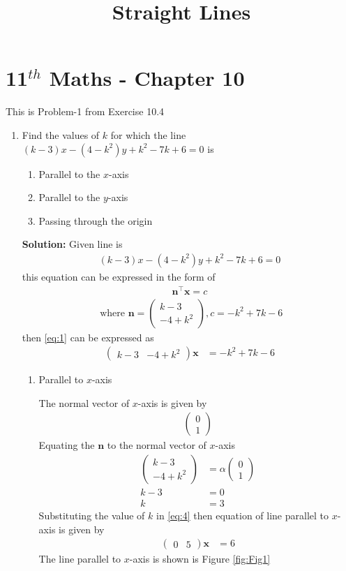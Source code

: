 \documentclass[12pt]{article}
\newcommand{\solution}{\noindent \textbf{Solution: }}
\newcommand{\myvec}[1]{\ensuremath{\begin{pmatrix}#1\end{pmatrix}}}
\let\vec\mathbf
\begin{document}
\begin{center}
\enlargethispage{-4cm}
\title{\textbf{Straight Lines}}
\date{\vspace{-5ex}} %
\maketitle
\end{center}
\setcounter{page}{1}
\section*{11$^{th}$ Maths - Chapter 10}
This is Problem-1 from Exercise 10.4
\begin{enumerate}
\item Find the values of $k$ for which the line $(k-3)x-(4-k^2)y+k^2-7k+6=0$ is
\begin{enumerate}
\item Parallel to the $x$-axis
\item Parallel to the $y$-axis
\item Passing through the origin
\end{enumerate}

\solution
Given line is
\begin{align}
(k-3)x-(4-k^2)y+k^2-7k+6=0 \label{eq:1}
\end{align}
this equation can be expressed in the form of 
\begin{align}
\vec{n}^{\top}\vec{x}=c \label{eq:2}
\end{align}
\begin{align}
\text{ where }
\vec{n} = \myvec{k-3\\-4+k^2} , c  = -k^2+7k-6
\end{align}
then \eqref{eq:1} can be expressed as
\begin{align}
\myvec{k-3 & -4+k^2}\vec{x} &=-k^2+7k-6\label{eq:4}
\end{align}
\begin{enumerate}
    \item Parallel to $x$-axis
    
The normal vector of $x$-axis is given by
\begin{align}
\myvec{0\\1}
\end{align}
Equating the $\vec{n}$ to the normal vector of $x$-axis
\begin{align}
\myvec{k-3\\-4+k^2} &=\alpha\myvec{0\\1}\\
k-3& =0\\
k &=3
\end{align}
Substituting the value of $k$ in \eqref{eq:4} then equation of line parallel to $x$-axis is given by
\begin{align}
        \myvec{0 & 5}\vec{x} &=6
\end{align}
The line parallel to $x$-axis is shown is Figure \eqref{fig:Fig1}


\end{enumerate}
\end{enumerate}
\end{document}
